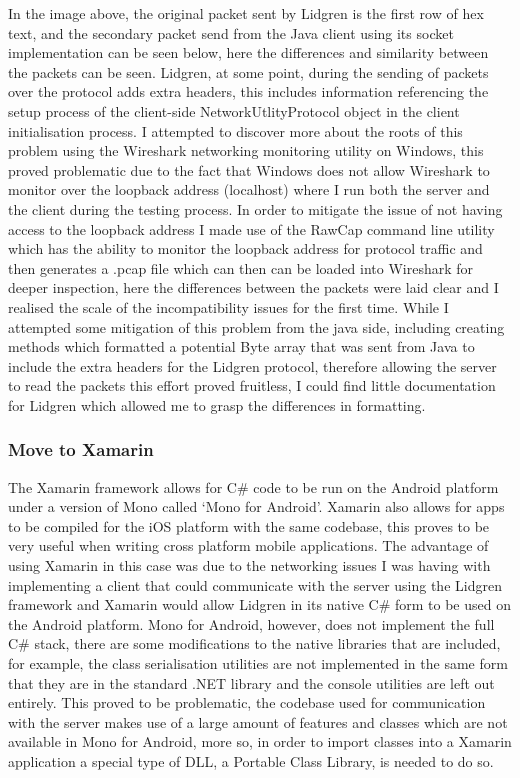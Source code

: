 \documentclass{article}
\begin{document}
In the image above, the original packet sent by Lidgren is the first row of hex text, and the secondary packet send from the Java client using its socket implementation can be seen below, here the differences and similarity between the packets can be seen. Lidgren, at some point, during the sending of packets over the protocol adds extra headers, this includes information referencing the setup process of the client-side NetworkUtlityProtocol object in the client initialisation process. I attempted to discover more about the roots of this problem using the Wireshark networking monitoring utility on Windows, this proved problematic due to the fact that Windows does not allow Wireshark to monitor over the loopback address (localhost) where I run both the server and the client during the testing process. In order to mitigate the issue of not having access to the loopback address I made use of the RawCap command line utility which has the ability to monitor the loopback address for protocol traffic and then generates a .pcap file which can then can be loaded into Wireshark for deeper inspection, here the differences between the packets were laid clear and I realised the scale of the incompatibility issues for the first time. While I attempted some mitigation of this problem from the java side, including creating methods which formatted a potential Byte array that was sent from Java to include the extra headers for the Lidgren protocol, therefore allowing the server to read the packets this effort proved fruitless, I could find little documentation for Lidgren which allowed me to grasp the differences in formatting.
\subsubsection{Move to Xamarin}
The Xamarin framework allows for C\# code to be run on the Android platform under a version of Mono called ‘Mono for Android’. Xamarin also allows for apps to be compiled for the iOS platform with the same codebase, this proves to be very useful when writing cross platform mobile applications. The advantage of using Xamarin in this case was due to the networking issues I was having with implementing a client that could communicate with the server using the Lidgren framework and Xamarin would allow Lidgren in its native C\# form to be used on the Android platform. Mono for Android, however, does not implement the full C\# stack, there are some modifications to the native libraries that are included, for example, the class serialisation utilities are not implemented in the same form that they are in the standard .NET library and the console utilities are left out entirely. This proved to be problematic, the codebase used for communication with the server makes use of a large amount of features and classes which are not available in Mono for Android, more so, in order to import classes into a Xamarin application a special type of DLL, a Portable Class Library, is needed to do so.
\end{document}
